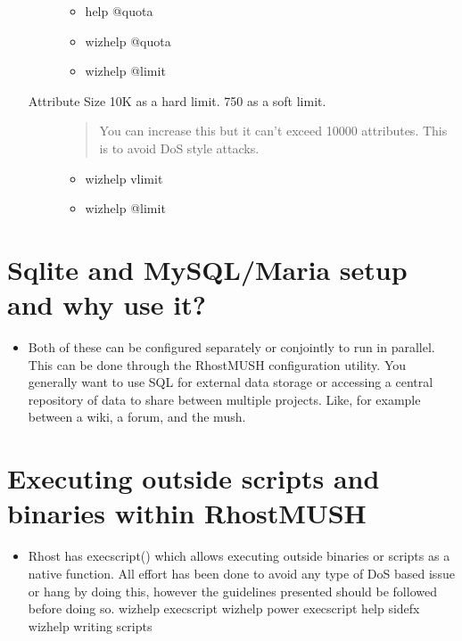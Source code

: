 \documentclass[letterpaper,10pt,english]{sphinxmanual}
\begin{document}
\begin{itemize}
\begin{description}
\begin{itemize}
\item {} 
\sphinxAtStartPar
help @quota

\item {} 
\sphinxAtStartPar
wizhelp @quota

\item {} 
\sphinxAtStartPar
wizhelp @limit

\end{itemize}

\item[{Attribute Size \sphinxhyphen{} 10K as a hard limit.  750 as a soft limit.}] \leavevmode\begin{quote}

\sphinxAtStartPar
You can increase this but it can’t exceed 10000
attributes.  This is to avoid DoS style attacks.
\end{quote}
\begin{itemize}
\item {} 
\sphinxAtStartPar
wizhelp vlimit

\item {} 
\sphinxAtStartPar
wizhelp @limit

\end{itemize}

\end{description}

\end{itemize}


\section{Sqlite and MySQL/Maria setup and why use it?}
\label{\detokenize{12-advanced:sqlite-and-mysql-maria-setup-and-why-use-it}}\begin{itemize}
\item {} 
\sphinxAtStartPar
Both of these can be configured separately or conjointly to
run in parallel.  This can be done through the RhostMUSH
configuration utility.  You generally want to use SQL for
external data storage or accessing a central repository
of data to share between multiple projects.  Like, for
example between a wiki, a forum, and the mush.

\end{itemize}


\section{Executing outside scripts and binaries within RhostMUSH}
\label{\detokenize{12-advanced:executing-outside-scripts-and-binaries-within-rhostmush}}\begin{itemize}
\item {} 
\sphinxAtStartPar
Rhost has execscript() which allows executing outside binaries
or scripts as a native function.  All effort has been done to
avoid any type of DoS based issue or hang by doing this, however
the guidelines presented should be followed before doing so.
\sphinxhyphen{} wizhelp execscript
\sphinxhyphen{} wizhelp power execscript
\sphinxhyphen{} help sidefx
\sphinxhyphen{} wizhelp writing scripts

\end{itemize}
\end{document}
